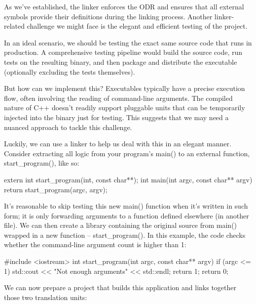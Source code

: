 As we’ve established, the linker enforces the ODR and ensures that all external symbols provide their definitions during the linking process. Another linker-related challenge we might face is the elegant and efficient testing of the project.

In an ideal scenario, we should be testing the exact same source code that runs in production. A comprehensive testing pipeline would build the source code, run tests on the resulting binary, and then package and distribute the executable (optionally excluding the tests themselves).

But how can we implement this? Executables typically have a precise execution flow, often involving the reading of command-line arguments. The compiled nature of C++ doesn’t readily support pluggable units that can be temporarily injected into the binary just for testing. This suggests that we may need a nuanced approach to tackle this challenge.

Luckily, we can use a linker to help us deal with this in an elegant manner. Consider extracting all logic from your program’s main() to an external function, start\_program(), like so:


\begin{cpp}
extern int start_program(int, const char**);
int main(int argc, const char** argv) {
    return start_program(argc, argv);
}
\end{cpp}

It’s reasonable to skip testing this new main() function when it’s written in such form; it is only forwarding arguments to a function defined elsewhere (in another file). We can then create a library containing the original source from main() wrapped in a new function – start\_program(). In this example, the code checks whether the command-line argument count is higher than 1:


\begin{cpp}
#include <iostream>
int start_program(int argc, const char** argv) {
    if (argc <= 1) {
        std::cout << "Not enough arguments" << std::endl;
        return 1;
    }
    return 0;
}
\end{cpp}

We can now prepare a project that builds this application and links together those two translation units:



